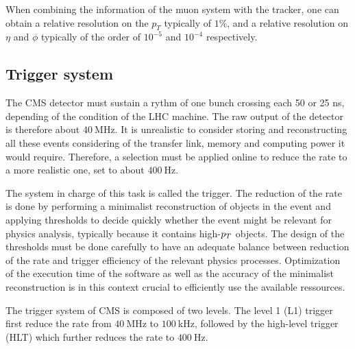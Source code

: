         When combining the information of the muon system with the tracker, one can
        obtain a relative resolution on the $p_T$ typically of $1\%$, and a relative
        resolution on $\eta$ and $\phi$ typically of the order of $10^{-5}$ and $10^{-4}$
        respectively.

        \subsection{Trigger system}

        The CMS detector must sustain a rythm of one bunch crossing each 50 or 25 ns, depending
        of the condition of the LHC machine. The raw output of the detector is therefore
        about $40~$MHz. It is unrealistic to consider storing and reconstructing all these events
        considering of the transfer link, memory and computing power it would require.
        Therefore, a selection must be applied online to reduce the rate to a more realistic
        one, set to about $400~$Hz.

        The system in charge of this task is called the trigger. The reduction of the rate
        is done by performing a minimalist reconstruction of objects in the event
        and applying thresholds to decide quickly whether the event might be relevant for
        physics analysis, typically because it contains high-$p_T$ objects. The design of
        the thresholds must be done carefully to have an adequate balance between reduction
        of the rate and trigger efficiency of the relevant physics processes. Optimization
        of the execution time of the software as well as the accuracy of the minimalist
        reconstruction is in this context crucial to efficiently use the available ressources.

        The trigger system of CMS is composed of two levels. The level 1 (L1) trigger first
        reduce the rate from $40~$MHz to $100~$kHz, followed by the high-level trigger (HLT)
        which further reduces the rate to $400~$Hz.


